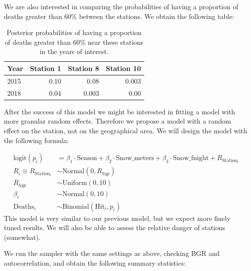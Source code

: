 \documentclass[10pt]{extarticle}
\begin{document}
We are also interested in comparing the probabilities of having a proportion of deaths greater than 60\% between the stations. We obtain the following table:

\begin{table}[ht]
	\centering
	\begin{tabular}{l|r|r|r}
		\hline
		Year & Station 1 & Station 8 & Station 10 \\
		\hline
		2015 & 0.10 & 0.08 & 0.003 \\
		2018 & 0.04 & 0.003 & 0.00 \\
		\hline
	\end{tabular}
	\caption{Posterior probabilities of having a proportion of deaths greater than 60\% near these stations in the years of interest.}
	\label{tab:post_60}
\end{table}

After the success of this model we might be interested in fitting a model with more granular random effects. Therefore we propose a model with a random effect on the station, not on the geographical area. We will design the model with the following formula:

\begin{align*}
\mathrm{logit}(p_i) &= \beta_1 \cdot \mathrm{Season} + \beta_2 \cdot \mathrm{Snow\_meters} + \beta_3 \cdot \mathrm{Snow\_fnight} + R_{\mathrm{Station}_i}\\
R_i \equiv R_{\mathrm{Station}_i} &\sim \mathrm{Normal}(0, R_{hyp})\\
R_{hyp} &\sim \mathrm{Uniform}(0, 10)\\
\beta_i &\sim \mathrm{Normal}(0, 10)\\
\mathrm{Deaths}_i &\sim \mathrm{Binomial}(\mathrm{Hit}_i, p_i)
\end{align*}
This model is very similar to our previous model, but we expect more finely tuned results. We will also be able to assess the relative danger of stations (somewhat). 

We run the sampler with the same settings as above, checking BGR and autocorrelation, and obtain the following summary statistics: 
\end{document}
